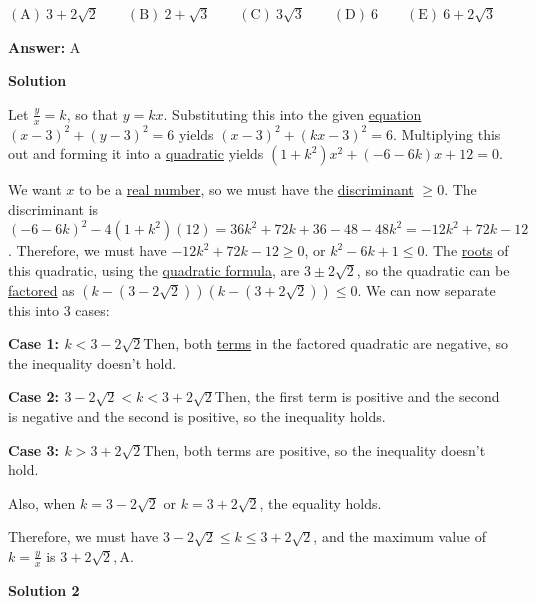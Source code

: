 \begin{enumerate}
 $\mathrm{(A) \ }3+2\sqrt{2} \qquad \mathrm{(B) \ }2+\sqrt{3} \qquad \mathrm{(C) \ } 3\sqrt{3} \qquad \mathrm{(D) \ }6 \qquad \mathrm{(E) \ } 6+2\sqrt{3}$

 \textbf{Answer: }A



\textbf{Solution}

Let $\frac{y}{x}=k$, so that $y=kx$. Substituting this into the given \href{https://artofproblemsolving.com/wiki/index.php?title=Equation}{equation} $(x-3)^2+(y-3)^2=6$ yields $(x-3)^2+(kx-3)^2=6$. Multiplying this out and forming it into a \href{https://artofproblemsolving.com/wiki/index.php?title=Quadratic}{quadratic} yields $(1+k^2)x^2+(-6-6k)x+12=0$. 

 We want $x$ to be a \href{https://artofproblemsolving.com/wiki/index.php?title=Real\_number}{real number}, so we must have the \href{https://artofproblemsolving.com/wiki/index.php?title=Discriminant}{discriminant} $\geq0$. The discriminant is $(-6-6k)^2-4(1+k^2)(12)=36k^2+72k+36-48-48k^2=-12k^2+72k-12$. Therefore, we must have $-12k^2+72k-12\geq0$, or $k^2-6k+1\leq0$. The \href{https://artofproblemsolving.com/wiki/index.php?title=Root\_(polynomial)}{roots} of this quadratic, using the \href{https://artofproblemsolving.com/wiki/index.php?title=Quadratic\_formula}{quadratic formula}, are $3\pm2\sqrt{2}$, so the quadratic can be \href{https://artofproblemsolving.com/wiki/index.php?title=Factoring}{factored} as $(k-(3-2\sqrt{2}))(k-(3+2\sqrt{2}))\leq0$. We can now separate this into $3$ cases:

 \textbf{Case 1: $k<3-2\sqrt{2}$}Then, both \href{https://artofproblemsolving.com/wiki/index.php?title=Term&action=edit&redlink=1}{terms} in the factored quadratic are negative, so the inequality doesn't hold.

 \textbf{Case 2: $3-2\sqrt{2}<k<3+2\sqrt{2}$}Then, the first term is positive and the second is negative and the second is positive, so the inequality holds.

 \textbf{Case 3: $k>3+2\sqrt{2}$}Then, both terms are positive, so the inequality doesn't hold.

 Also, when $k=3-2\sqrt{2}$ or $k=3+2\sqrt{2}$, the equality holds.

 Therefore, we must have $3-2\sqrt{2}\leq k\leq3+2\sqrt{2}$, and the maximum value of $k=\frac{y}{x}$ is ${3+2\sqrt{2}}, \boxed{\text{A}}$.

 



\textbf{Solution 2}


\end{enumerate}
